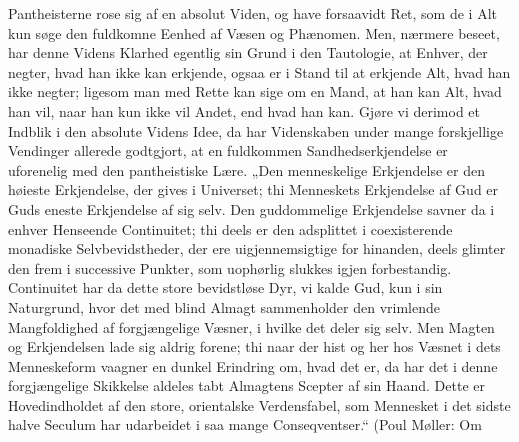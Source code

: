 \documentclass[12pt]{book}
\newcommand{\opage}[1]{\marginnote{\footnotesize\textit{[#1]}}}
\begin{document}
\opage{279} %
Pantheisterne rose sig af en absolut Viden, og have forsaavidt Ret, som de i Alt kun
søge den fuldkomne Eenhed af Væsen og Phænomen. Men, nærmere beseet, har denne Videns
Klarhed egentlig sin Grund i den Tautologie, at Enhver, der negter, hvad han ikke kan
erkjende, ogsaa er i Stand til at erkjende Alt, hvad han ikke negter; ligesom man med
Rette kan sige om en Mand, at han kan Alt, hvad han vil, naar han kun ikke vil Andet,
end hvad han kan. Gjøre vi derimod et Indblik i den absolute Videns Idee, da har
Videnskaben under mange forskjellige Vendinger allerede godtgjort, at en fuldkommen
Sandhedserkjendelse er uforenelig med den pantheistiske Lære. „Den menneskelige
Erkjendelse er den høieste Erkjendelse, der gives i Universet; thi Menneskets
Erkjendelse af Gud er Guds eneste Erkjendelse af sig selv. Den guddommelige Erkjendelse
savner da i enhver Henseende Continuitet; thi deels er den adsplittet i coexisterende
monadiske Selvbevidstheder, der ere uigjennemsigtige for hinanden, deels glimter den
frem i successive Punkter, som uophørlig slukkes igjen forbestandig. Continuitet har da
dette store bevidstløse Dyr, vi kalde Gud, kun i sin Naturgrund, hvor det med blind
Almagt sammenholder den vrimlende Mangfoldighed af forgjængelige Væsner, i hvilke det
deler sig selv. Men Magten og Erkjendelsen lade sig aldrig forene; thi naar der hist og
her hos Væsnet i dets Menneskeform vaagner en dunkel Erindring om, hvad det er, da har
det i denne forgjængelige Skikkelse aldeles tabt Almagtens Scepter af sin Haand. Dette
er Hovedindholdet af den store, orientalske Verdensfabel, som Mennesket i det sidste
halve Seculum har udarbeidet i saa mange Conseqventser.“ (Poul Møller: Om
\end{document}
